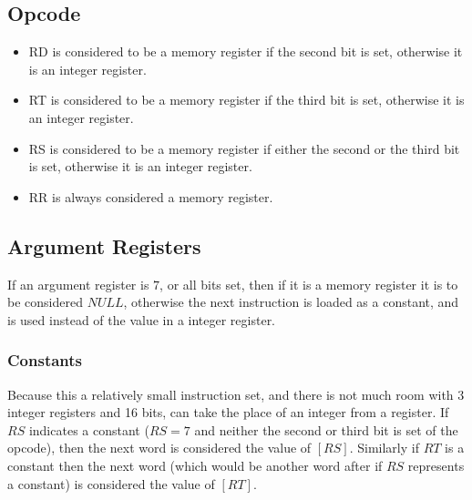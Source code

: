 \documentclass[12pt,letterpaper]{report}
\newcommand{\reg}[1]{\left[#1\right]}
\newcommand{\nil}{NULL}
\newcommand{\SEE}{\textbf{Forward Reference} }
\newcommand{\fref}[2]{#2 \ref{#1:#2}}
\newcommand{\instructions}[1]{\texttt{\\ #1}}
\newcommand{\comment}[1]{}
\begin{document}
\subsection{Opcode}
\begin{itemize}
\item RD is considered to be a memory register if the second bit is set, otherwise it is an integer register.
\item RT is considered to be a memory register if the third bit is set, otherwise it is an integer register.
\item RS is considered to be a memory register if either the second or the third bit is set, otherwise it is an integer register.
\item RR is always considered a memory register.
\end{itemize}
\subsection{Argument Registers}
If an argument register is $7$, or all bits set, then if it is a memory register it is to be considered $\nil$, otherwise the next instruction is loaded as a constant, and is used instead of the value in a integer register.
\subsubsection{Constants}
\label{label:Constants}
Because this a relatively small instruction set, and there is not much room with 3 integer registers and 16 bits, can take the place of an integer from a register. If $RS$ indicates a constant ($RS = 7$ and neither the second or third bit is set of the opcode), then the next word is considered the value of $\reg{RS}$. Similarly if $RT$ is a constant then the next word (which would be another word after if $RS$ represents a constant) is considered the value of $\reg{RT}$.
\comment{
Later in this document, constants will be made use of inside instructions. A constant inside of an instruction will be indicated by  being just a number as opposed to a register (which are always prefixed by $M$ or $I$). For instance
\instructions{
ADD, I0, 10, I0 \\
}
$I0$ would reference the $1^{st}$ integer register, while $10$ is equivalent to the $8^{th}$ integer register, followed by a constant.

Labels are a special kind of constant, to help reference function calls. A label is denoted by the a '$:$', on the left side of a word that starts a line, while label constants are prefixed by the '$:$', so for instance
\instructions{
LABEL: \\
ADD :LABEL, 3, V0 \\
LABEL2: \\ 
}
would add $3$ to the location of the instruction, with two constants the instruction happens to reference the next instructions, so $\reg{V0} = :LABEL2$.

\SEE \fref{instruction}{ADD}
}
\end{document}
